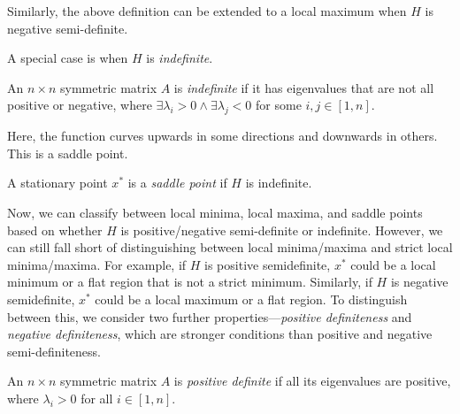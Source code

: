 Similarly, the above definition can be extended to a local maximum when $H$ is negative semi-definite.



A special case is when $H$ is \textit{indefinite}.

\begin{definition}

    An $n \times n$ symmetric matrix $A$ is \textit{indefinite} if it has eigenvalues that are not all positive or negative, where $\exists \lambda_i > 0 \wedge \exists \lambda_j < 0$ for some $i, j \in [1, n]$.

\end{definition}

Here, the function curves upwards in some directions and downwards in others. This is a saddle point.



\begin{definition}

    A stationary point $x^*$ is a \textit{saddle point} if $H$ is indefinite.

\end{definition}




Now, we can classify between local minima, local maxima, and saddle points based on whether $H$ is positive/negative semi-definite or indefinite. However, we can still fall short of distinguishing between local minima/maxima and strict local minima/maxima. For example, if $H$ is positive semidefinite, $x^*$ could be a local minimum or a flat region that is not a strict minimum. Similarly, if $H$ is negative semidefinite, $x^*$ could be a local maximum or a flat region. To distinguish between this, we consider two further properties---\textit{positive definiteness} and \textit{negative definiteness}, which are stronger conditions than positive and negative semi-definiteness.



\begin{definition}

    An $n \times n$ symmetric matrix $A$ is \textit{positive definite} if all its eigenvalues are positive, where $\lambda_i > 0$ for all $i \in [1, n]$.

\end{definition}

